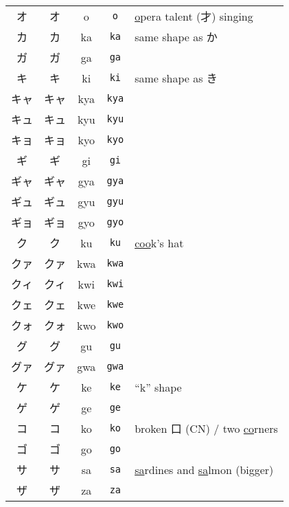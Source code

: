 \documentclass[../nihongo-gakushuu-kyouzai.tex]{subfiles}
\begin{document}
\begin{longtable}[c]{@{}ccccl@{}}
    オ & {\sffamily オ} & o & \texttt{o} & \ul{o}pera talent (才) singing \\
    カ & {\sffamily カ} & ka & \texttt{ka} & same shape as か \\
    ガ & {\sffamily ガ} & ga & \texttt{ga} &  \\
    キ & {\sffamily キ} & ki & \texttt{ki} & same shape as き \\
    キャ & {\sffamily キャ} & kya & \texttt{kya} &  \\
    キュ & {\sffamily キュ} & kyu & \texttt{kyu} &  \\
    キョ & {\sffamily キョ} & kyo & \texttt{kyo} &  \\
    ギ & {\sffamily ギ} & gi & \texttt{gi} &  \\
    ギャ & {\sffamily ギャ} & gya & \texttt{gya} &  \\
    ギュ & {\sffamily ギュ} & gyu & \texttt{gyu} &  \\
    ギョ & {\sffamily ギョ} & gyo & \texttt{gyo} &  \\
    ク & {\sffamily ク} & ku & \texttt{ku} & \ul{coo}k's hat \\
    \color{blue} クァ & \color{blue} {\sffamily クァ} & \color{blue} kwa & \color{blue} \texttt{kwa} & \\
    \color{blue} クィ & \color{blue} {\sffamily クィ} & \color{blue} kwi & \color{blue} \texttt{kwi} & \\
    \color{blue} クェ & \color{blue} {\sffamily クェ} & \color{blue} kwe & \color{blue} \texttt{kwe} & \\
    \color{blue} クォ & \color{blue} {\sffamily クォ} & \color{blue} kwo & \color{blue} \texttt{kwo} & \\
    グ & {\sffamily グ} & gu & \texttt{gu} &  \\
    \color{blue} グァ & \color{blue} {\sffamily グァ} & \color{blue} gwa & \color{blue} \texttt{gwa} & \\
    ケ & {\sffamily ケ} & ke & \texttt{ke} & ``k'' shape \\
    ゲ & {\sffamily ゲ} & ge & \texttt{ge} &  \\
    コ & {\sffamily コ} & ko & \texttt{ko} & broken 口 (CN) / two \ul{co}rners \\
    ゴ & {\sffamily ゴ} & go & \texttt{go} &  \\
    サ & {\sffamily サ} & sa & \texttt{sa} & \ul{sa}rdines and \ul{sa}lmon (bigger) \\
    ザ & {\sffamily ザ} & za & \texttt{za} &  \\

\end{longtable}
\end{document}
